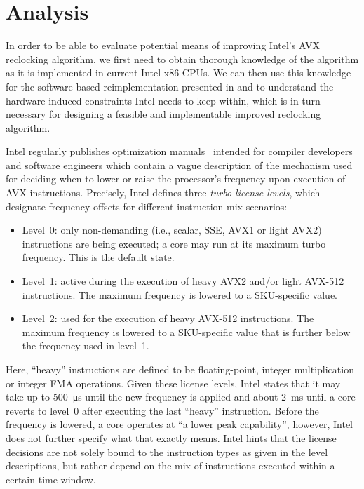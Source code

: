 \chapter{Analysis}
\label{sec:analysis}

In order to be able to evaluate potential means of improving Intel's \gls{AVX} reclocking algorithm, we first need to obtain thorough knowledge of the algorithm as it is implemented in current Intel x86 \glspl{CPU}. We can then use this knowledge for the software-based reimplementation presented in  and to understand the hardware-induced constraints Intel needs to keep within, which is in turn necessary for designing a feasible and implementable improved reclocking algorithm.

Intel regularly publishes optimization manuals~\cite{inteloptimizationmanual} intended for compiler developers and software engineers which contain a vague description of the mechanism used for deciding when to lower or raise the processor's frequency upon execution of \gls{AVX} instructions. Precisely, Intel defines three \textit{turbo license levels}, which designate frequency offsets for different instruction mix scenarios:

\begin{itemize}
	\item Level~0: only non-demanding (i.e., scalar, \gls{SSE}, \gls{AVX1} or light \gls{AVX2}) instructions are being executed; a core may run at its maximum turbo frequency. This is the default state.
	\item Level~1: active during the execution of heavy \gls{AVX2} and/or light \gls{AVX-512} instructions. The maximum frequency is lowered to a \gls{SKU}-specific value.
	\item Level~2: used for the execution of heavy \gls{AVX-512} instructions. The maximum frequency is lowered to a \gls{SKU}-specific value that is further below the frequency used in level~1.
\end{itemize}

Here, \enquote{heavy} instructions are defined to be floating-point, integer multiplication or integer \gls{FMA} operations. Given these license levels, Intel states that it may take up to \SI{500}{\micro\second} until the new frequency is applied and about \SI{2}{\milli\second} until a core reverts to level~0 after executing the last \enquote{heavy} instruction. Before the frequency is lowered, a core operates at \enquote{a lower peak capability}, however, Intel does not further specify what that exactly means. Intel hints that the license decisions are not solely bound to the instruction types as given in the level descriptions, but rather depend on the mix of instructions executed within a certain time window.

